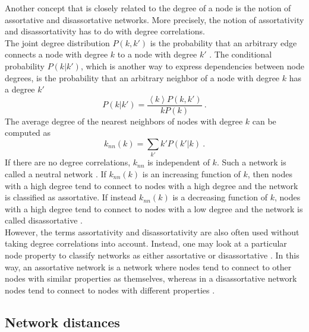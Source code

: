 \documentclass[11 pt , letterpaper , twoside , openright]{book}
\begin{document}
Another concept that is closely related to the degree of a node is the notion of assortative and disassortative networks. More precisely, the notion of assortativity and disassortativity has to do with degree correlations. \\
The joint degree distribution $P(k, k')$ is the probability that an arbitrary edge connects a node with degree $k$ to a node with degree $k'$ \cite{F.Costa2007}. The conditional probability $P(k|k')$, which is another way to express dependencies between node degrees, is the probability that an arbitrary neighbor of a node with degree $k$ has a degree $k'$ \cite{F.Costa2007}
\begin{equation}
	P(k|k') = \frac{\left<k\right>P(k, k')}{kP(k)} \ .
\end{equation}
The average degree of the nearest neighbors of nodes with degree $k$ can be computed as \cite{F.Costa2007}
\begin{equation}
	k_{nn}(k) = \sum_{k'} k'P(k'|k) \ .
\end{equation}
If there are no degree correlations, $k_{nn}$ is independent of $k$. Such a network is called a neutral network \cite{F.Costa2007}. If $k_{nn}(k)$ is an increasing function of $k$, then nodes with a high degree tend to connect to nodes with a high degree and the network is classified as assortative. If instead $k_{nn}(k)$ is a decreasing function of $k$, nodes with a high degree tend to connect to nodes with a low degree and the network is called disassortative \cite{F.Costa2007}.\\
However, the terms assortativity and disassortativity are also often used without taking degree correlations into account. Instead, one may look at a particular node property to classify networks as either assortative or disassortative \cite{Thed2014}. In this way, an assortative network is a network where nodes tend to connect to other nodes with similar properties as themselves, whereas in a disassortative network nodes tend to connect to nodes with different properties \cite{Thed2014}.


\newpage
\subsection{Network distances}
\end{document}
